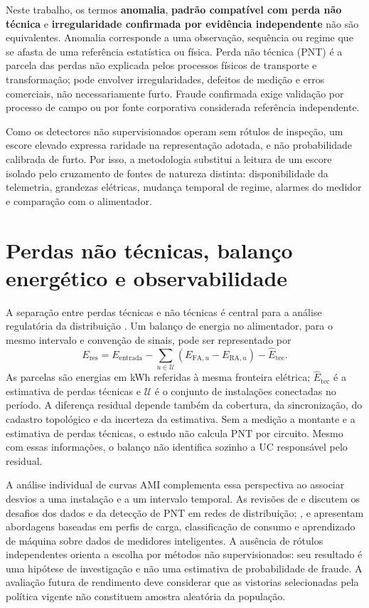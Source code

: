 Neste trabalho, os termos \textbf{anomalia}, \textbf{padrão compatível com perda não técnica} e \textbf{irregularidade confirmada por evidência independente} não são equivalentes. Anomalia corresponde a uma observação, sequência ou regime que se afasta de uma referência estatística ou física. Perda não técnica (PNT) é a parcela das perdas não explicada pelos processos físicos de transporte e transformação; pode envolver irregularidades, defeitos de medição e erros comerciais, não necessariamente furto. Fraude confirmada exige validação por processo de campo ou por fonte corporativa considerada referência independente.

Como os detectores não supervisionados operam sem rótulos de inspeção, um escore elevado expressa raridade na representação adotada, e não probabilidade calibrada de furto. Por isso, a metodologia substitui a leitura de um escore isolado pelo cruzamento de fontes de natureza distinta: disponibilidade da telemetria, grandezas elétricas, mudança temporal de regime, alarmes do medidor e comparação com o alimentador.

\section{Perdas não técnicas, balanço energético e observabilidade}\label{pnt-balanco}

A separação entre perdas técnicas e não técnicas é central para a análise regulatória da distribuição \autocite{aneel2026,aneelren1000,glauner2017}. Um balanço de energia no alimentador, para o mesmo intervalo e convenção de sinais, pode ser representado por
\begin{equation}\label{balanco}
E_{\mathrm{res}}=E_{\mathrm{entrada}}-\sum_{u\in\mathcal U}(E_{\mathrm{FA},u}-E_{\mathrm{RA},u})-\widehat E_{\mathrm{tec}}.
\end{equation}
As parcelas são energias em kWh referidas à mesma fronteira elétrica; $\widehat E_{\mathrm{tec}}$ é a estimativa de perdas técnicas e $\mathcal U$ é o conjunto de instalações conectadas no período. A diferença residual depende também da cobertura, da sincronização, do cadastro topológico e da incerteza da estimativa. Sem a medição a montante e a estimativa de perdas técnicas, o estudo não calcula PNT por circuito. Mesmo com essas informações, o balanço não identifica sozinho a UC responsável pelo residual.

A análise individual de curvas AMI complementa essa perspectiva ao associar desvios a uma instalação e a um intervalo temporal. As revisões de \textcite{glauner2017} e \textcite{messinis2018} discutem os desafios dos dados e da detecção de PNT em redes de distribuição; \textcite{villar2017}, \textcite{jokar2016} e \textcite{buzau2019} apresentam abordagens baseadas em perfis de carga, classificação de consumo e aprendizado de máquina sobre dados de medidores inteligentes. A ausência de rótulos independentes orienta a escolha por métodos não supervisionados: seu resultado é uma hipótese de investigação e não uma estimativa de probabilidade de fraude. A avaliação futura de rendimento deve considerar que as vistorias selecionadas pela política vigente não constituem amostra aleatória da população.

